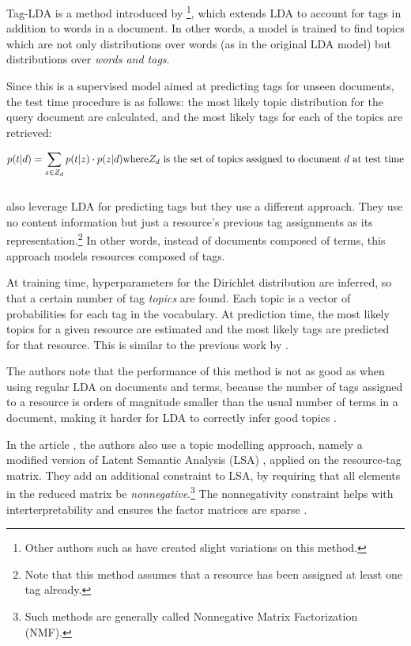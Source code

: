Tag-LDA is a method introduced by \cite{si_sun_2008}\footnote{Other authors such as \cite{hu_etal_2012} have created slight variations on this method.}, which extends LDA to account for tags in addition to words in a document. In other words, a model is trained to find topics which are not only distributions over words (as in the original LDA model) but distributions over \textit{words and tags}. 

Since this is a supervised model aimed at predicting tags for unseen documents, the test time procedure is as follows: the most likely topic distribution for the query document are calculated, and the most likely tags for each of the topics are retrieved:

$$
p(t | d ) = \sum_{z \in Z_d} p(t|z) \cdot p(z|d)

\textnormal{where} Z_d \ \textnormal{is the set of topics assigned to document} \ d \ \textnormal{at test time}
$$\\

\cite{krestel_fankhauser_2010} also leverage LDA for predicting tags but they use a different approach. They use no content information but just a resource's previous tag assignments as its representation.\footnote{Note that this method assumes that a resource has been assigned at least one tag already.} In other words, instead of documents composed of terms, this approach models resources composed of tags.

At training time, hyperparameters for the Dirichlet distribution are inferred, so that a certain number of tag \textit{topics} are found. Each topic is a vector of probabilities for each tag in the vocabulary. At prediction time, the most likely topics for a given resource are estimated and the most likely tags are predicted for that resource. This is similar to the previous work by \cite{si_sun_2008}.

The authors note that the performance of this method is not as good as when using regular LDA on documents and terms, because the number of tags assigned to a resource is orders of magnitude smaller than the usual number of terms in a document, making it harder for LDA to correctly infer good topics \citep{krestel_fankhauser_2010}.

In the article \cite{zhang_etal_2014}, the authors also use a topic modelling approach, namely a modified version of Latent Semantic Analysis (LSA) \citep{deerwester_etal_1990}, applied on the resource-tag matrix. They add an additional constraint to LSA, by requiring that all elements in the reduced matrix be \textit{nonnegative}.\footnote{Such methods are generally called Nonnegative Matrix Factorization (NMF).} The nonnegativity constraint helps with interterpretability and ensures the factor matrices are sparse \citep{gillis_2014}.

